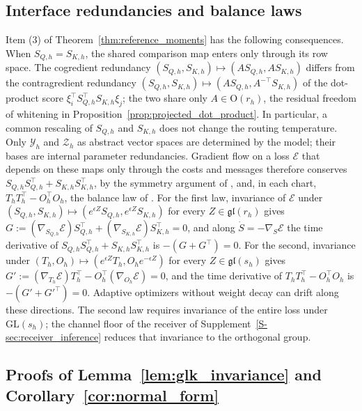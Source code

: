 \documentclass[twoside,11pt]{article}
\begin{document}
\subsection{Interface redundancies and balance laws}
\label{app:interface_redundancies}

Item (3) of Theorem~\ref{thm:reference_moments} has the following consequences. When $S_{Q,h}=S_{K,h}$, the shared comparison map enters only through its row space. The cogredient redundancy $(S_{Q,h},S_{K,h})\mapsto(AS_{Q,h},AS_{K,h})$ differs from the contragredient redundancy $(S_{Q,h},S_{K,h})\mapsto(AS_{Q,h},A^{-\top}S_{K,h})$ of the dot-product score $\xi_i^\top S_{Q,h}^\top S_{K,h}\xi_j$; the two share only $A\in\mathrm O(r_h)$, the residual freedom of whitening in Proposition~\ref{prop:projected_dot_product}. In particular, a common rescaling of $S_{Q,h}$ and $S_{K,h}$ does not change the routing temperature. Only $\mathcal Y_h$ and $\mathcal Z_h$ as abstract vector spaces are determined by the model; their bases are internal parameter redundancies. Gradient flow on a loss $\mathcal E$ that depends on these maps only through the costs and messages therefore conserves $S_{Q,h}S_{Q,h}^\top+S_{K,h}S_{K,h}^\top$, by the symmetry argument of \citet{Kunin2021NeuralMechanics}, and, in each chart, $T_hT_h^\top-O_h^\top O_h$, the balance law of \citet{du2018balanced}. For the first law, invariance of $\mathcal E$ under $(S_{Q,h},S_{K,h})\mapsto(e^{\epsilon Z}S_{Q,h},e^{\epsilon Z}S_{K,h})$ for every $Z\in\mathfrak{gl}(r_h)$ gives $G:=(\nabla_{S_{Q,h}}\mathcal E)S_{Q,h}^\top+(\nabla_{S_{K,h}}\mathcal E)S_{K,h}^\top=0$, and along $\dot S=-\nabla_S\mathcal E$ the time derivative of $S_{Q,h}S_{Q,h}^\top+S_{K,h}S_{K,h}^\top$ is $-(G+G^\top)=0$. For the second, invariance under $(T_h,O_h)\mapsto(e^{\epsilon Z}T_h,O_he^{-\epsilon Z})$ for every $Z\in\mathfrak{gl}(s_h)$ gives $G':=(\nabla_{T_h}\mathcal E)T_h^\top-O_h^\top(\nabla_{O_h}\mathcal E)=0$, and the time derivative of $T_hT_h^\top-O_h^\top O_h$ is $-(G'+G'^\top)=0$. Adaptive optimizers without weight decay can drift along these directions. The second law requires invariance of the entire loss under $\mathrm{GL}(s_h)$; the channel floor of the receiver of Supplement~\ref{S-sec:receiver_inference} reduces that invariance to the orthogonal group.

\subsection{Proofs of Lemma~\ref{lem:glk_invariance} and Corollary~\ref{cor:normal_form}}
\label{app:proof_normal_form}
\end{document}
